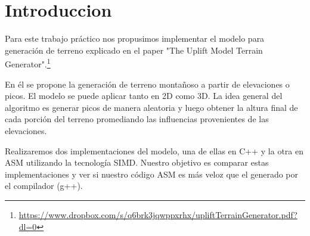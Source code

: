 \section{Introduccion}

Para este trabajo práctico nos propusimos implementar el modelo para generación de terreno explicado en el paper "The Uplift Model Terrain Generator".\footnote{\url{https://www.dropbox.com/s/q6brk3jqwppxrhx/upliftTerrainGenerator.pdf?dl=0}}

En él se propone la generación de terreno montañoso a partir de elevaciones o picos. El modelo se puede aplicar tanto en 2D como 3D. La idea general del algoritmo es generar picos de manera aleatoria y luego obtener la altura final de cada porción del terreno promediando las influencias provenientes de las elevaciones.

Realizaremos dos implementaciones del modelo, una de ellas en C++ y la otra en ASM utilizando la tecnología SIMD. Nuestro objetivo es comparar estas implementaciones y ver si nuestro código ASM es más veloz que el generado por el compilador (g++).